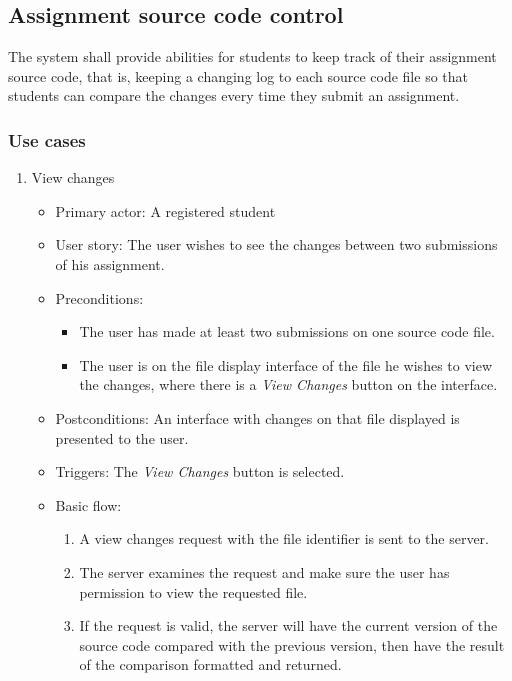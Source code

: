 \subsection{Assignment source code control}
The system shall provide abilities for students to keep track of their
assignment source code, that is, keeping a changing log to each source code
file so that students can compare the changes every time they submit an
assignment.

\subsubsection{Use cases}
\begin{enumerate}
\item View changes
\begin{itemize}
    \item Primary actor: A registered student
    \item User story: The user wishes to see the changes between two
        submissions of his assignment.
    \item Preconditions:
        \begin{itemize}
            \item The user has made at least two submissions on one source code
                file.
            \item The user is on the file display interface of the file he
                wishes to view the changes, where there is a \emph{View Changes}
                button on the interface.
        \end{itemize}
    \item Postconditions:
        An interface with changes on that file displayed is presented to the
        user.
    \item Triggers:
        The \emph{View Changes} button is selected.
    \item Basic flow:
        \begin{enumerate}
            \item A view changes request with the file identifier is sent
                to the server.
            \item The server examines the request and make sure the user has
                permission to view the requested file.
            \item If the request is valid, the server will have the current
                version of the source code compared with the previous version,
                then have the result of the comparison formatted and
                returned.
        \end{enumerate}
\end{itemize}
\end{enumerate}

